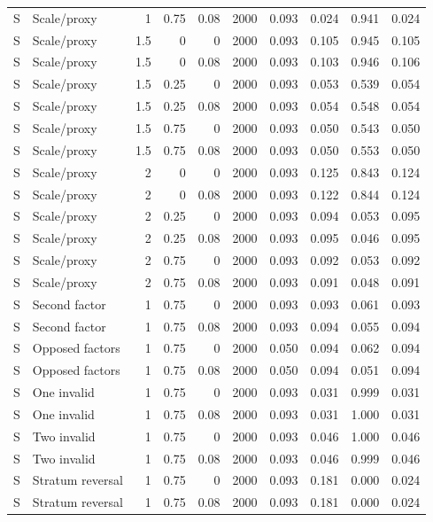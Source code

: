 \begin{longtable}{lp{2.5cm}rrrrrrrr}
S & Scale/proxy & 1 & 0.75 & 0.08 & 2000 & 0.093 & 0.024 & 0.941 & 0.024 \\
S & Scale/proxy & 1.5 & 0 & 0 & 2000 & 0.093 & 0.105 & 0.945 & 0.105 \\
S & Scale/proxy & 1.5 & 0 & 0.08 & 2000 & 0.093 & 0.103 & 0.946 & 0.106 \\
S & Scale/proxy & 1.5 & 0.25 & 0 & 2000 & 0.093 & 0.053 & 0.539 & 0.054 \\
S & Scale/proxy & 1.5 & 0.25 & 0.08 & 2000 & 0.093 & 0.054 & 0.548 & 0.054 \\
S & Scale/proxy & 1.5 & 0.75 & 0 & 2000 & 0.093 & 0.050 & 0.543 & 0.050 \\
S & Scale/proxy & 1.5 & 0.75 & 0.08 & 2000 & 0.093 & 0.050 & 0.553 & 0.050 \\
S & Scale/proxy & 2 & 0 & 0 & 2000 & 0.093 & 0.125 & 0.843 & 0.124 \\
S & Scale/proxy & 2 & 0 & 0.08 & 2000 & 0.093 & 0.122 & 0.844 & 0.124 \\
S & Scale/proxy & 2 & 0.25 & 0 & 2000 & 0.093 & 0.094 & 0.053 & 0.095 \\
S & Scale/proxy & 2 & 0.25 & 0.08 & 2000 & 0.093 & 0.095 & 0.046 & 0.095 \\
S & Scale/proxy & 2 & 0.75 & 0 & 2000 & 0.093 & 0.092 & 0.053 & 0.092 \\
S & Scale/proxy & 2 & 0.75 & 0.08 & 2000 & 0.093 & 0.091 & 0.048 & 0.091 \\
S & Second factor & 1 & 0.75 & 0 & 2000 & 0.093 & 0.093 & 0.061 & 0.093 \\
S & Second factor & 1 & 0.75 & 0.08 & 2000 & 0.093 & 0.094 & 0.055 & 0.094 \\
S & Opposed factors & 1 & 0.75 & 0 & 2000 & 0.050 & 0.094 & 0.062 & 0.094 \\
S & Opposed factors & 1 & 0.75 & 0.08 & 2000 & 0.050 & 0.094 & 0.051 & 0.094 \\
S & One invalid & 1 & 0.75 & 0 & 2000 & 0.093 & 0.031 & 0.999 & 0.031 \\
S & One invalid & 1 & 0.75 & 0.08 & 2000 & 0.093 & 0.031 & 1.000 & 0.031 \\
S & Two invalid & 1 & 0.75 & 0 & 2000 & 0.093 & 0.046 & 1.000 & 0.046 \\
S & Two invalid & 1 & 0.75 & 0.08 & 2000 & 0.093 & 0.046 & 0.999 & 0.046 \\
S & Stratum reversal & 1 & 0.75 & 0 & 2000 & 0.093 & 0.181 & 0.000 & 0.024 \\
S & Stratum reversal & 1 & 0.75 & 0.08 & 2000 & 0.093 & 0.181 & 0.000 & 0.024 \\

\end{longtable}
